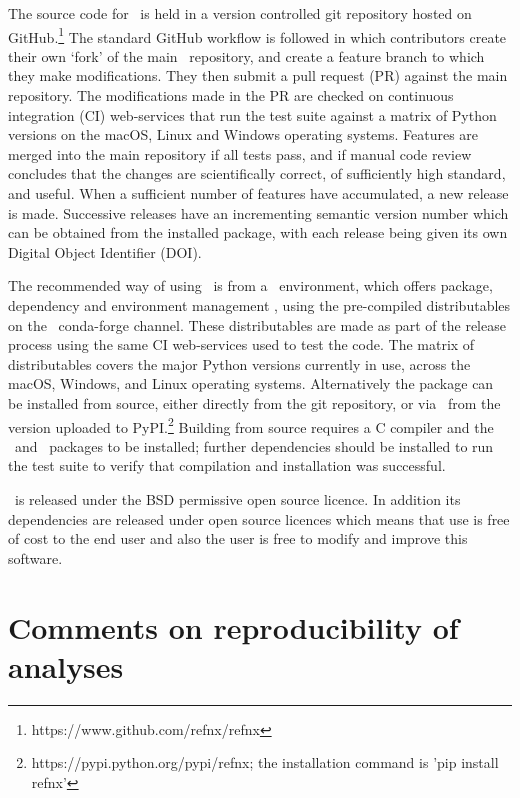 \documentclass[pdf,preprint]{iucr}
\begin{document}
The source code for \ is held in a version controlled git repository hosted on GitHub.\footnote{https://www.github.com/refnx/refnx} The standard GitHub workflow is followed in which contributors create their own `fork' of the main \ repository, and create a feature branch to which they make modifications. They then submit a pull request (PR) against the main repository. The modifications made in the PR are checked on continuous integration (CI) web-services that run the test suite against a matrix of Python versions on the macOS, Linux and Windows operating systems. Features are merged into the main repository if all tests pass, and if manual code review concludes that the changes are scientifically correct, of sufficiently high standard, and useful. When a sufficient number of features have accumulated, a new release is made. Successive releases have an incrementing semantic version number which can be obtained from the installed package, with each release being given its own Digital Object Identifier (DOI).

The recommended way of using \ is from a \conda\ environment, which offers package, dependency and environment management \cite{conda}, using the pre-compiled distributables on the \ conda-forge channel. These distributables are made as part of the release process using the same CI web-services used to test the code. The matrix of distributables covers the major Python versions currently in use, across the macOS, Windows, and Linux operating systems. Alternatively the package can be installed from source, either directly from the git repository, or via \pip\ from the version uploaded to PyPI.\footnote{https://pypi.python.org/pypi/refnx; the installation command is 'pip install refnx'} Building from source requires a C compiler and the \Cython\ and \NumPy\ packages to be installed; further dependencies should be installed to run the test suite to verify that compilation and installation was successful.

\ is released under the BSD permissive open source licence. In addition its dependencies are released under open source licences which means that use is free of cost to the end user and also the user is free to modify and improve this software.

\section{Comments on reproducibility of analyses}
\end{document}
